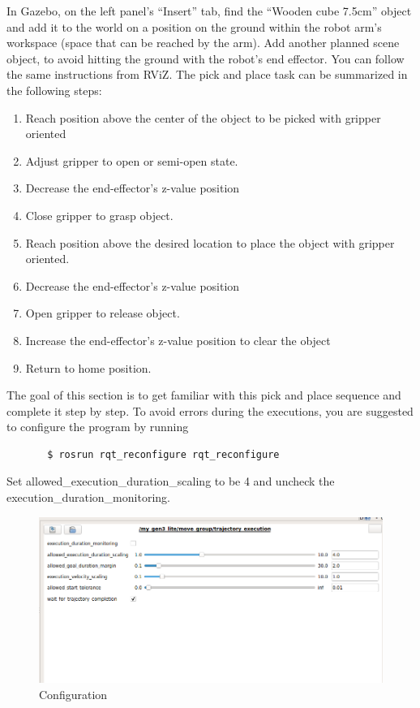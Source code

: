 \documentclass[12pt]{article}
\begin{document}
In Gazebo, on the left panel’s “Insert” tab, find the “Wooden cube 7.5cm” object and add it to the world on a position on the ground within the robot arm’s workspace (space that can be reached by the arm).
Add another planned scene object, to avoid hitting the ground with the robot’s end effector. You can follow the same instructions from RViZ.
The pick and place task can be summarized in the following steps:
\begin{enumerate}
    \item Reach position above the center of the object to be picked with gripper oriented
    \item Adjust gripper to open or semi-open state.
    \item Decrease the end-effector’s z-value position
    \item Close gripper to grasp object.
    \item Reach position above the desired location to place the object with gripper oriented.
    \item Decrease the end-effector’s z-value position
    \item Open gripper to release object.
    \item Increase the end-effector’s z-value position to clear the object
    \item Return to home position.
    
\end{enumerate}

The goal of this section is to get familiar with this pick and place sequence and complete it step by step. To avoid errors during the executions, you are suggested to configure the program by running
\begin{verbatim}
       $ rosrun rqt_reconfigure rqt_reconfigure
    \end{verbatim}
Set allowed\_execution\_duration\_scaling to be 4 and uncheck the execution\_duration\_monitoring.
\begin{figure}[H]
    \vspace{-10pt}
    \centering\includegraphics[width=13cm]{images/config.png}\vspace{-10pt}
    \caption{Configuration}\label{fig:kinovarviz}
    \end{figure}
\end{document}
